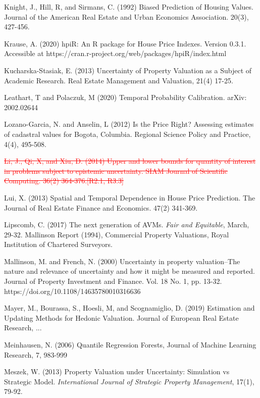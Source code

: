 \documentclass[colTwo]{anon}
\theoremstyle{definition}
\begin{document}
\begin{thebibliography}{50}
\harvarditem{}{}{}Knight, J., Hill, R, and Sirmans, C. (1992) Biased Prediction of Housing Values. Journal of the American Real Estate and Urban Economics Association. 20(3), 427-456. 

\harvarditem{}{}{}Krause, A. (2020) hpiR: An R package for House Price Indexes.  Version 0.3.1.  Accessible at https://cran.r-project.org/web/packages/hpiR/index.html

\harvarditem{}{}{}Kucharska-Stasiak, E. (2013) Uncertainty of Property Valuation as a Subject of Academic Research. Real Estate Management and Valuation, 21(4) 17-25.

\harvarditem{}{}{}Leathart, T and Polaczuk, M  (2020) Temporal Probability Calibration. arXiv: 2002.02644

\harvarditem{}{}{}Lozano-Garcia, N. and Anselin, L (2012) Is the Price Right?  Assessing estimates of cadastral values for Bogota, Columbia. Regional Science Policy and Practice, 4(4), 495-508.

\harvarditem{}{}{}\textcolor{red}{\st{Li, J., Qi, X, and Xiu, D. (2014) Upper and lower bounds for quantity of interest in problems subject to epistemic uncertainty. SIAM Journal of Scientific Computing. 36(2) 364-376.[R2.1, R3.3]}}

\harvarditem{}{}{}Lui, X. (2013) Spatial and Temporal Dependence in House Price Prediction. The Journal of Real Estate Finance and Economics. 47(2) 341-369. 
 
\harvarditem{}{}{}Lipscomb, C. (2017) The next generation of AVMs. \textit{Fair and Equitable}, March, 29-32.  
\harvarditem{}{}{}Mallinson Report (1994), Commercial Property Valuations, Royal Institution of Chartered Surveyors.

\harvarditem{}{}{}Mallinson, M. and French, N. (2000) Uncertainty in property valuation--The nature and relevance of uncertainty and how it might be measured and reported. Journal of Property Investment and Finance. Vol. 18 No. 1, pp. 13-32. https://doi.org/10.1108/14635780010316636

\harvarditem{}{}{}Mayer, M., Bourassa, S., Hoesli, M, and Scognamiglio, D. (2019) Estimation and Updating Methods for Hedonic Valuation. Journal of European Real Estate Research, ...

\harvarditem{}{}{}Meinhausen, N.  (2006) Quantile Regression Forests, Journal of Machine Learning Research, 7, 983-999

\harvarditem{}{}{}Meszek, W. (2013) Property Valuation under Uncertainty: Simulation vs Strategic Model. \textit{International Journal of Strategic Property Management}, 17(1), 79-92. 


\end{thebibliography}
\end{document}
